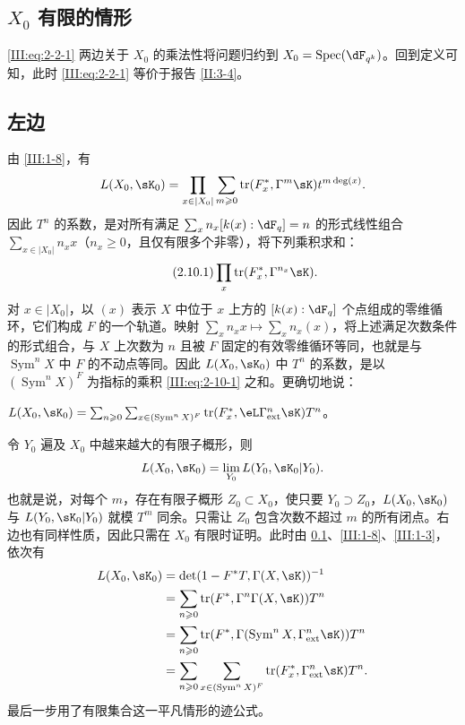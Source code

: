 \subsection{\texorpdfstring{$X_0$}{X0} 有限的情形}\label{III:2-9}
\eqref{III:eq:2-2-1} 两边关于 $X_0$ 的乘法性将问题归约到 $X_0=\spec(\dF_{q^k})$。回到定义可知，此时 \eqref{III:eq:2-2-1} 等价于报告 \ref{II:3-4}。

\subsection{左边}\label{III:2-10}
由 \ref{III:1-8}，有
\[L(X_0,\sK_0)=\prod_{x\in|X_0|}\sum_{m\geqslant0}\tr(F_x^*,\Gamma^m\sK)t^{m\deg(x)}.\]
因此 $T^n$ 的系数，是对所有满足 $\sum_xn_x[k(x):\dF_q]=n$ 的形式线性组合 $\sum_{x\in|X_0|}n_xx$（$n_x\geqslant0$，且仅有限多个非零），将下列乘积求和：
\begin{equation*}\tag{2.10.1}\label{III:eq:2-10-1}
\prod_x\tr(F_x^*,\Gamma^{n_x}\sK).
\end{equation*}
对 $x\in|X_0|$，以 $(x)$ 表示 $X$ 中位于 $x$ 上方的 $[k(x):\dF_q]$ 个点组成的零维循环，它们构成 $F$ 的一个轨道。映射 $\sum_xn_xx\mapsto\sum_xn_x(x)$，将上述满足次数条件的形式组合，与 $X$ 上次数为 $n$ 且被 $F$ 固定的有效零维循环等同，也就是与 $\operatorname{Sym}^nX$ 中 $F$ 的不动点等同。因此 $L(X_0,\sK_0)$ 中 $T^n$ 的系数，是以 $(\operatorname{Sym}^nX)^F$ 为指标的乘积 \eqref{III:eq:2-10-1} 之和。更确切地说：
\begin{lemma_}\label{III:2-11}
$L(X_0,\sK_0)=\sum_{n\geqslant0}\sum_{x\in(\operatorname{Sym}^nX)^F}\tr(F_x^*,\eL\Gamma_{\mathrm{ext}}^n\sK)T^n$。
\end{lemma_}
令 $Y_0$ 遍及 $X_0$ 中越来越大的有限子概形，则
\[L(X_0,\sK_0)=\lim_{Y_0}L(Y_0,\sK_0|Y_0).\]
也就是说，对每个 $m$，存在有限子概形 $Z_0\subset X_0$，使只要 $Y_0\supset Z_0$，$L(X_0,\sK_0)$ 与 $L(Y_0,\sK_0|Y_0)$ 就模 $T^m$ 同余。只需让 $Z_0$ 包含次数不超过 $m$ 的所有闭点。右边也有同样性质，因此只需在 $X_0$ 有限时证明。此时由 \ref{III:2-9}、\ref{III:1-8}、\ref{III:1-3}，依次有
\begin{align*}
L(X_0,\sK_0)&=\det(1-F^*T,\Gamma(X,\sK))^{-1}\\
&=\sum_{n\geqslant0}\tr(F^*,\Gamma^n\Gamma(X,\sK))T^n\\
&=\sum_{n\geqslant0}\tr(F^*,\Gamma(\operatorname{Sym}^nX,\Gamma_{\mathrm{ext}}^n\sK))T^n\\
&=\sum_{n\geqslant0}\sum_{x\in(\operatorname{Sym}^nX)^F}\tr(F_x^*,\Gamma_{\mathrm{ext}}^n\sK)T^n.
\end{align*}
最后一步用了有限集合这一平凡情形的迹公式。

